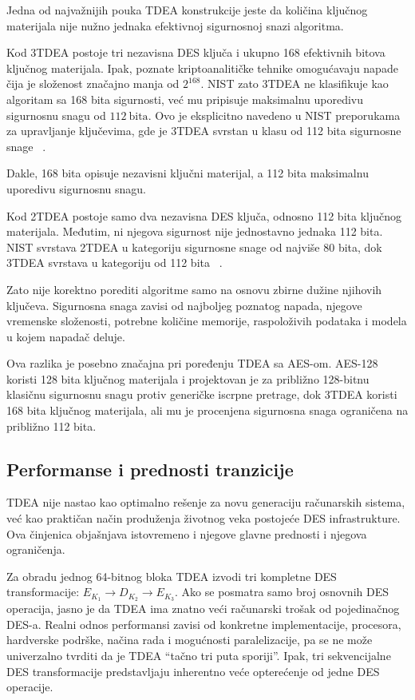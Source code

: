 Jedna od najvažnijih pouka TDEA konstrukcije jeste da količina ključnog
materijala nije nužno jednaka efektivnoj sigurnosnoj snazi algoritma.

Kod 3TDEA postoje tri nezavisna DES ključa i ukupno 168 efektivnih
bitova ključnog materijala. Ipak, poznate kriptoanalitičke tehnike
omogućavaju napade čija je složenost značajno manja od
$2^{168}$. NIST zato 3TDEA ne klasifikuje kao algoritam sa 168 bita
sigurnosti, već mu pripisuje maksimalnu uporedivu sigurnosnu snagu od
$112~\text{bita}$.
Ovo je eksplicitno navedeno u NIST preporukama za upravljanje
ključevima, gde je 3TDEA svrstan u klasu od 112 bita sigurnosne snage
~\cite{sp800-57pt1r5}.

Dakle, 168 bita opisuje nezavisni ključni materijal, a 112 bita
maksimalnu uporedivu sigurnosnu snagu.

Kod 2TDEA postoje samo dva nezavisna DES ključa, odnosno 112 bita
ključnog materijala. Međutim, ni njegova sigurnost nije jednostavno
jednaka 112 bita. NIST svrstava 2TDEA u kategoriju sigurnosne snage od najviše
80 bita, dok 3TDEA svrstava u kategoriju od 112 bita
~\cite{sp800-57pt1r5}.

Zato nije korektno porediti algoritme samo na osnovu zbirne dužine
njihovih ključeva. Sigurnosna snaga zavisi od najboljeg poznatog napada,
njegove vremenske složenosti, potrebne količine memorije, raspoloživih
podataka i modela u kojem napadač deluje.

Ova razlika je posebno značajna pri poređenju TDEA sa AES-om.
AES-128 koristi 128 bita ključnog materijala i projektovan je za približno
128-bitnu klasičnu sigurnosnu snagu protiv generičke iscrpne pretrage,
dok 3TDEA koristi 168 bita ključnog materijala, ali mu je procenjena
sigurnosna snaga ograničena na približno 112 bita.


\subsection{Performanse i prednosti tranzicije}
\label{subsec:tdea_performanse}

TDEA nije nastao kao optimalno rešenje za novu generaciju računarskih
sistema, već kao praktičan način produženja životnog veka postojeće DES
infrastrukture. Ova činjenica objašnjava istovremeno i njegove glavne
prednosti i njegova ograničenja.

Za obradu jednog 64-bitnog bloka TDEA izvodi tri kompletne DES
transformacije:
$E_{K_1} \rightarrow D_{K_2} \rightarrow E_{K_3}$.
Ako se posmatra samo broj osnovnih DES operacija, jasno je da TDEA ima
znatno veći računarski trošak od pojedinačnog DES-a. Realni odnos
performansi zavisi od konkretne implementacije, procesora, hardverske
podrške, načina rada i mogućnosti paralelizacije, pa se ne može
univerzalno tvrditi da je TDEA ``tačno tri puta sporiji''. Ipak, tri
sekvencijalne DES transformacije predstavljaju inherentno veće
opterećenje od jedne DES operacije.

